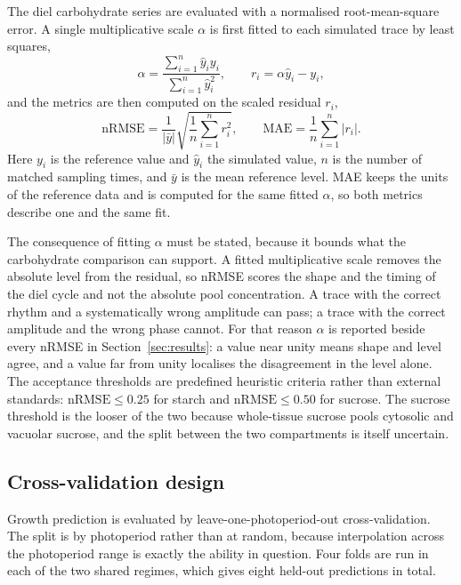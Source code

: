 The diel carbohydrate series are evaluated with a normalised root-mean-square
error. A single multiplicative scale $\alpha$ is first fitted to each simulated
trace by least squares,
\begin{equation}
\alpha = \frac{\sum_{i=1}^{n} \hat{y}_i y_i}{\sum_{i=1}^{n} \hat{y}_i^{2}},
\qquad
r_i = \alpha \hat{y}_i - y_i ,
\label{eq:alpha}
\end{equation}
and the metrics are then computed on the scaled residual $r_i$,
\begin{equation}
\mathrm{nRMSE} = \frac{1}{|\bar{y}|}
\sqrt{\frac{1}{n}\sum_{i=1}^{n} r_i^{2}},
\qquad
\mathrm{MAE} = \frac{1}{n}\sum_{i=1}^{n} |r_i| .
\label{eq:nrmse}
\end{equation}
Here $y_i$ is the reference value and $\hat{y}_i$ the simulated value, $n$ is
the number of matched sampling times, and $\bar{y}$ is the mean reference
level. MAE
keeps the units of the reference data and is computed for the same fitted
$\alpha$, so both metrics describe one and the same fit.

The consequence of fitting $\alpha$ must be stated, because it bounds what the
carbohydrate comparison can support. A fitted multiplicative scale removes the
absolute level from the residual, so nRMSE scores the shape and the timing of
the diel cycle and not the absolute pool concentration. A trace with the
correct rhythm and a systematically wrong amplitude can pass; a trace with the
correct amplitude and the wrong phase cannot. For that reason $\alpha$ is
reported beside every nRMSE in Section~\ref{sec:results}: a value near unity
means shape and level agree, and a value far from unity localises the
disagreement in the level alone. The acceptance thresholds are
predefined heuristic criteria rather than external standards: $\mathrm{nRMSE}
\le 0.25$ for starch and $\mathrm{nRMSE} \le 0.50$ for sucrose. The sucrose
threshold is the looser of the two because whole-tissue sucrose pools cytosolic
and vacuolar sucrose, and the split between the two compartments is itself
uncertain.

\subsection{Cross-validation design}
\label{sec:crossval_design}

Growth prediction is evaluated by leave-one-photoperiod-out cross-validation.
The split is by photoperiod rather than at random, because interpolation across
the photoperiod range is exactly the ability in question. Four folds are run in
each of the two shared regimes, which gives eight held-out predictions in total.

